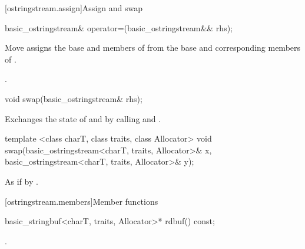 [ostringstream.assign]{Assign and swap}

%
%
\begin{itemdecl}
basic_ostringstream& operator=(basic_ostringstream&& rhs);
\end{itemdecl}

\begin{itemdescr}
\pnum
\effects Move assigns the base and members of  from the base and corresponding
members of .

\pnum
\returns {}.
\end{itemdescr}

%
%
\begin{itemdecl}
void swap(basic_ostringstream& rhs);
\end{itemdecl}

\begin{itemdescr}
\pnum
\effects Exchanges the state of  and
 by calling
 and
.
\end{itemdescr}


%
%
\begin{itemdecl}
template <class charT, class traits, class Allocator>
  void swap(basic_ostringstream<charT, traits, Allocator>& x,
            basic_ostringstream<charT, traits, Allocator>& y);
\end{itemdecl}

\begin{itemdescr}
\pnum
\effects As if by .
\end{itemdescr}

[ostringstream.members]{Member functions}

%
\begin{itemdecl}
basic_stringbuf<charT, traits, Allocator>* rdbuf() const;
\end{itemdecl}

\begin{itemdescr}
\pnum
\returns
{}.
\end{itemdescr}

